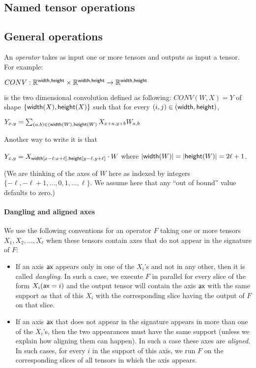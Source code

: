 \documentclass{article}
\begin{document}
\subsection{Named tensor operations}
\label{sec:operations}

\subsection{General operations}

An \emph{operator}  takes as input one or more tensors and outputs as input a tensor. For example:

$CONV: \mathbb{R}^{\mathsf{width},\mathsf{height}} \times \mathbb{R}^{\mathsf{width},\mathsf{height}} \rightarrow \mathbb{R}^{\mathsf{width},\mathsf{height}}$

is the two dimensional convolution defined as following: $CONV(W,X)=Y$ of shape $\{ \mathsf{width}(X),\mathsf{height}(X) \}$ such that for every $(i,j) \in (\mathsf{width},\mathsf{height})$, 

$Y_{x,y} = \sum_{(a,b) \in (\mathsf{width}(W),\mathsf{height}(W)} X_{x+a,y+b} W_{a,b}$

Another way to write it is that 

$Y_{x,y} =  X_{\mathsf{width}[x-\ell:x+\ell],\mathsf{height}[y-\ell,y+\ell]} \cdot W$ where $|\mathsf{width}(W)|=|\mathsf{height}(W)|=2\ell+1$.

(We are thinking of the axes of $W$ here as indexed by integers $\{ -\ell, -\ell+1, \ldots, 0, 1,\ldots, \ell \}$. We assume here that any ``out of bound'' value defaults to zero.)

\paragraph{Dangling and aligned axes} We use the following conventions for an operator $F$ taking one or more tensors $X_1,X_2,\ldots,X_\ell$ when these tensors contain axes that do not appear in the signature of $F$:

\begin{itemize}
  \item If an axis $\mathsf{ax}$ appears only in one of the $X_i$'s and not in any other, then it is called \emph{dangling}. In such a case, we execute $F$ in parallel for every slice of the form $X_i(\mathsf{ax}=i)$ and the output tensor will contain the axis $\mathsf{ax}$ with the same support as that of this $X_i$ with the corresponding slice having the output of $F$ on that slice.

  \item If an axis $\mathsf{ax}$ that does not appear in the signature appears in more than one of the $X_i$'s, then the two appearances must have the same support (unless we explain how aligning them can happen). In such a case these axes are \emph{aligned}. In such cases, for every $i$ in the support of this axis, we run $F$ on the corresponding slices of all tensors in which the axis appears.

\end{itemize}
\end{document}
